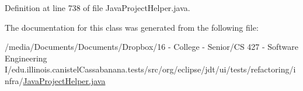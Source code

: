 Definition at line 738 of file JavaProjectHelper.java.



The documentation for this class was generated from the following file:\begin{DoxyCompactItemize}
\item 
/media/Documents/Documents/Dropbox/16 -\/ College -\/ Senior/CS 427 -\/ Software Engineering I/edu.illinois.canistelCassabanana.tests/src/org/eclipse/jdt/ui/tests/refactoring/infra/\hyperlink{JavaProjectHelper_8java}{JavaProjectHelper.java}\end{DoxyCompactItemize}
